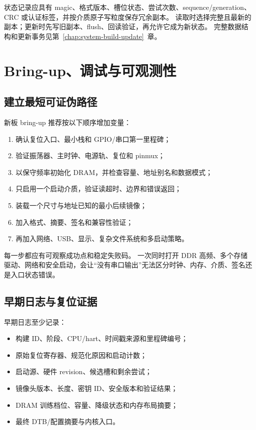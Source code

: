 状态记录应具有 magic、格式版本、槽位状态、尝试次数、sequence/generation、CRC 或认证标签，并按介质原子写粒度保存冗余副本。
读取时选择完整且最新的副本；更新时先写旧副本、flush、回读验证，再允许它成为新状态。
完整数据结构和更新事务见第~\ref{chap:system-build-update}~章。

\section{Bring-up、调试与可观测性}

\subsection{建立最短可证伪路径}

新板 bring-up 推荐按以下顺序增加变量：

\begin{enumerate}
  \item 确认复位入口、最小栈和 GPIO/串口第一里程碑；
  \item 验证振荡器、主时钟、电源轨、复位和 pinmux；
  \item 以保守频率初始化 DRAM，并检查容量、地址别名和数据模式；
  \item 只启用一个启动介质，验证读超时、边界和错误返回；
  \item 装载一个尺寸与地址已知的最小后续镜像；
  \item 加入格式、摘要、签名和兼容性验证；
  \item 再加入网络、USB、显示、复杂文件系统和多启动策略。
\end{enumerate}

每一步都应有可观察成功点和稳定失败码。
一次同时打开 DDR 高频、多个存储驱动、网络和安全启动，会让“没有串口输出”无法区分时钟、内存、介质、签名还是入口状态错误。

\subsection{早期日志与复位证据}

早期日志至少记录：

\begin{itemize}
  \item 构建 ID、阶段、CPU/hart、时间戳来源和里程碑编号；
  \item 原始复位寄存器、规范化原因和启动计数；
  \item 启动源、硬件 revision、候选槽和剩余尝试；
  \item 镜像头版本、长度、密钥 ID、安全版本和验证结果；
  \item DRAM 训练档位、容量、降级状态和内存布局摘要；
  \item 最终 DTB/配置摘要与内核入口。
\end{itemize}


